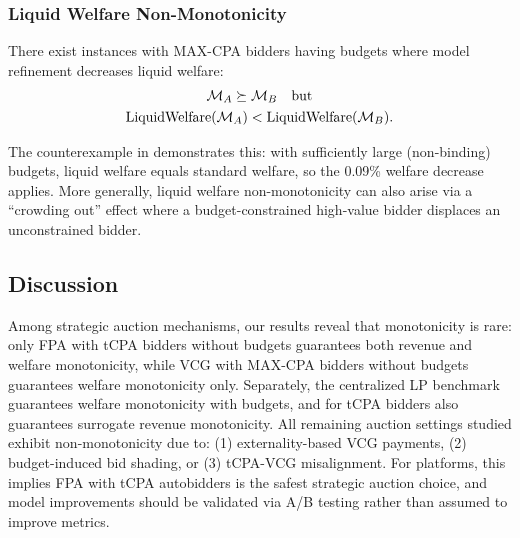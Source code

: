 \subsubsection{Liquid Welfare Non-Monotonicity}

\begin{theorem}
\label{thm:liquid-welfare-nonmono}
There exist instances with MAX-CPA bidders having budgets where model refinement decreases liquid welfare:
\begin{gather}
\mathcal{M}_A \succeq \mathcal{M}_B \quad \text{but} \notag \\
\text{LiquidWelfare}(\mathcal{M}_A) < \text{LiquidWelfare}(\mathcal{M}_B).
\end{gather}
\end{theorem}

The counterexample in  demonstrates this: with sufficiently large (non-binding) budgets, liquid welfare equals standard welfare, so the 0.09\% welfare decrease applies. More generally, liquid welfare non-monotonicity can also arise via a ``crowding out'' effect where a budget-constrained high-value bidder displaces an unconstrained bidder.

\subsection{Discussion}
\label{subsec:discussion}

Among strategic auction mechanisms, our results reveal that monotonicity is rare: only FPA with tCPA bidders without budgets guarantees both revenue and welfare monotonicity, while VCG with MAX-CPA bidders without budgets guarantees welfare monotonicity only. Separately, the centralized LP benchmark guarantees welfare monotonicity with budgets, and for tCPA bidders also guarantees surrogate revenue monotonicity. All remaining auction settings studied exhibit non-monotonicity due to: (1) externality-based VCG payments, (2) budget-induced bid shading, or (3) tCPA-VCG misalignment. For platforms, this implies FPA with tCPA autobidders is the safest strategic auction choice, and model improvements should be validated via A/B testing rather than assumed to improve metrics.
